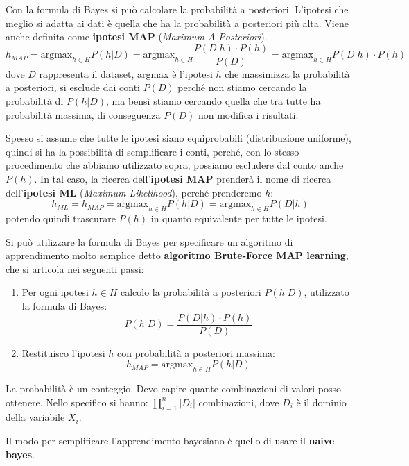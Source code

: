 Con la formula di Bayes si può calcolare la probabilità a posteriori. L'ipotesi
che meglio si adatta ai dati è quella che ha la probabilità a posteriori più alta.
Viene anche definita come \textbf{ipotesi MAP} (\textit{Maximum A Posteriori}).
\begin{equation}
    h_{MAP} = \text{argmax}_{h \in H} P(h|D) = \text{argmax}_{h \in H} \frac{P(D|h)
        \cdot P(h)}{P(D)} = \text{argmax}_{h \in H} P(D|h) \cdot P(h)
\end{equation}
dove $D$ rappresenta il dataset, argmax è l'ipotesi $h$ che massimizza la probabilità
a posteriori, si esclude dai conti $P(D)$ perché non stiamo cercando la probabilità
di $P(h|D)$, ma bensì stiamo cercando quella che tra tutte ha probabilità massima,
di conseguenza $P(D)$ non modifica i risultati.

Spesso si assume che tutte le ipotesi siano equiprobabili (distribuzione uniforme),
quindi si ha la possibilità di semplificare i conti, perché, con lo stesso
procedimento che abbiamo utilizzato sopra, possiamo escludere dal conto anche $P(h)$.
In tal caso, la ricerca dell'\textbf{ipotesi MAP} prenderà il nome di ricerca
dell'\textbf{ipotesi ML} (\textit{Maximum Likelihood}), perché prenderemo $h$:
\begin{equation}
    h_{ML} = h_{MAP} =\text{argmax}_{h \in H} P(h|D) =\text{argmax}_{h \in H} P(D|h)
\end{equation}
potendo quindi trascurare $P(h)$ in quanto equivalente per tutte le ipotesi.

Si può utilizzare la formula di Bayes per specificare un algoritmo di apprendimento
molto semplice detto \textbf{algoritmo Brute-Force MAP learning}, che si articola
nei seguenti passi:
\begin{enumerate}
    \item Per ogni ipotesi $h \in H$ calcolo la probabilità a posteriori $P(h|D)$,
          utilizzato la formula di Bayes:
          \begin{equation}
              P(h|D) = \frac{P(D|h) \cdot P(h)}{P(D)}
          \end{equation}
    \item Restituisco l'ipotesi $h$ con probabilità a posteriori massima:
          \begin{equation}
              h_{MAP} = \text{argmax}_{h \in H} P(h|D)
          \end{equation}
\end{enumerate}
\begin{nota}
    La probabilità è un conteggio. Devo capire quante combinazioni di valori posso
    ottenere. Nello specifico si hanno: $\prod_{i=1}^n |D_i|$ combinazioni, dove
    $D_i$ è il dominio della variabile $X_i$.
\end{nota}
Il modo per semplificare l'apprendimento bayesiano è quello di usare il 
\textbf{naive bayes}.

